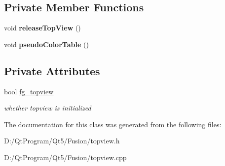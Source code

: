 \subsection*{Private Member Functions}
\begin{DoxyCompactItemize}
\item 
\hypertarget{class_top_view_a56698a690e0107a9c5fc7bb7740b47fe}{}void {\bfseries release\+Top\+View} ()\label{class_top_view_a56698a690e0107a9c5fc7bb7740b47fe}

\item 
\hypertarget{class_top_view_a63a2c70756e7f4fd5f86000091a1c51b}{}void {\bfseries pseudo\+Color\+Table} ()\label{class_top_view_a63a2c70756e7f4fd5f86000091a1c51b}

\end{DoxyCompactItemize}
\subsection*{Private Attributes}
\begin{DoxyCompactItemize}
\item 
\hypertarget{class_top_view_ad38788eb0cf2dc43399a4f7d85d62c52}{}bool \hyperlink{class_top_view_ad38788eb0cf2dc43399a4f7d85d62c52}{fg\+\_\+topview}\label{class_top_view_ad38788eb0cf2dc43399a4f7d85d62c52}

\begin{DoxyCompactList}\small\item\em whether topview is initialized \end{DoxyCompactList}\end{DoxyCompactItemize}


The documentation for this class was generated from the following files\+:\begin{DoxyCompactItemize}
\item 
D\+:/\+Qt\+Program/\+Qt5/\+Fusion/topview.\+h\item 
D\+:/\+Qt\+Program/\+Qt5/\+Fusion/topview.\+cpp\end{DoxyCompactItemize}
